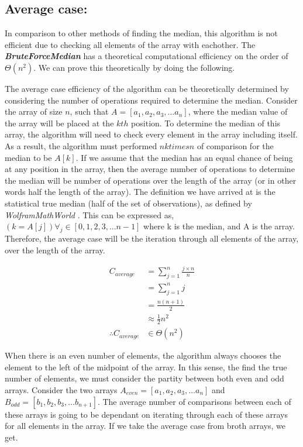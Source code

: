 \documentclass[12pt]{article}
\begin{document}
	
	\subsection{Average case:}
	In comparison to other methods of finding the median, this algorithm is not efficient due to checking all elements of the array with eachother. The \textit{\textbf{BruteForceMedian}} has a theoretical computational efficiency on the order of $\Theta(n^2)$. We can prove this theoretically by doing the following.
	
	The average case efficiency of the algorithm can be theoretically determined by considering the number of operations required to determine the median. Consider the array of size $n$, such that $A = [a_1,a_2,a_3,...a_n]$, where the median value of the array will be placed at the $kth$ position. To determine the median of this array, the algorithm will need to check every element in the array including itself. As a result, the algorithm must performed $nktimes n$ of comparison for the median to be $A[k]$. If we assume that the median has an equal chance of being at any position in the array, then the average number of operations to determine the median will be number of operations over the length of the array (or in other words half the length of the array). The definition we have arrived at is the statistical true median (half of the set of observations), as defined by \textit{WolframMathWorld} \cite{RN4}. This can be expressed as, $(k=A[j])\forall_j\in[0,1,2,3,...n-1]$ where k is the median, and A is the array. Therefore, the average case will be the iteration through all elements of the array, over the length of the array.
	
	\begin{align*}
	 C_{average} &= \sum\limits_{j=1}^{n}\frac{j \times n}{n} \\
	 					&= \sum\limits_{j=1}^{n}j\\
	 					&= \frac{n(n+1)}{2}\\
	 					&\approx\frac{1}{2}n^2\\
	 					\therefore C_{average} &\in \Theta(n^2)
	\end{align*}
	
	When there is an even number of elements, the algorithm always chooses the element to the left of the midpoint of the array. In this sense, the find the true number of elements, we must consider the partity between both even and odd arrays. Consider the two arrays $A_{even} = [a_1,a_2,a_3,...a_n]$ and $B_{odd} = [b_1,b_2,b_3,...b_{n+1}]$. The average number of comparisons between each of these arrays is going to be dependant on iterating through each of these arrays for all elements in the array. If we take the average case from broth arrays, we get.
	
\end{document}
